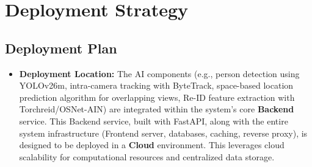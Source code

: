 \section{Deployment Strategy}
\label{section:deployment_aic} %

\subsection{Deployment Plan}
\label{subsection:deployment_plan_aic}
\begin{itemize}
    \item \textbf{Deployment Location:}
        The AI components (e.g., person detection using YOLOv26m, intra-camera tracking with ByteTrack, space-based location prediction algorithm for overlapping views, Re-ID feature extraction with Torchreid/OSNet-AIN) are integrated within the system's core \textbf{Backend} service. This Backend service, built with FastAPI, along with the entire system infrastructure (Frontend server, databases, caching, reverse proxy), is designed to be deployed in a \textbf{Cloud} environment. This leverages cloud scalability for computational resources and centralized data storage.


\end{itemize}
